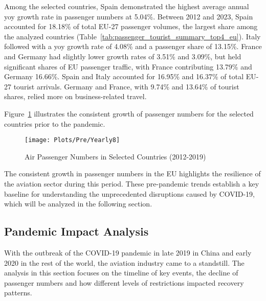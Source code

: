 \documentclass[12pt,onehalfspacing,headsepline,oneside,openright,a4paper, fleqn]{report}
\begin{document}
Among the selected countries, Spain demonstrated the highest average annual \gls{yoy} growth rate in passenger numbers at 5.04\%. Between 2012 and 2023, Spain accounted for 18.18\% of total EU-27 passenger volumes, the largest share among the analyzed countries (Table~\ref{tab:passenger_tourist_summary_top4_eu}). Italy followed with a \gls{yoy} growth rate of 4.08\% and a passenger share of 13.15\%. France and Germany had slightly lower growth rates of 3.51\% and 3.09\%, but held significant shares of EU passenger traffic, with France contributing 13.79\% and Germany 16.66\%. Spain and Italy accounted for 16.95\% and 16.37\% of total EU-27 tourist arrivals. Germany and France, with 9.74\% and 13.64\% of tourist shares, relied more on business-related travel.

Figure~\ref{fig:pre_selected_countries} illustrates the consistent growth of passenger numbers for the selected countries prior to the pandemic. 

\begin{figure}[H]
    \centering
    \caption{Air Passenger Numbers in Selected Countries (2012-2019)}
    \label{fig:pre_selected_countries}
	\texttt{[image: Plots/Pre/Yearly8]}
\end{figure}

The consistent growth in passenger numbers in the EU highlights the resilience of the aviation sector during this period. These pre-pandemic trends establish a key baseline for understanding the unprecedented disruptions caused by COVID-19, which will be analyzed in the following section.



\newpage

\subsection{Pandemic Impact Analysis}
\label{sec:pandemic_impact}

With the outbreak of the COVID-19 pandemic in late 2019 in China and early 2020 in the rest of the world, the aviation industry came to a standstill. The analysis in this section focuses on the timeline of key events, the decline of passenger numbers and how different levels of restrictions impacted recovery patterns.
\end{document}
